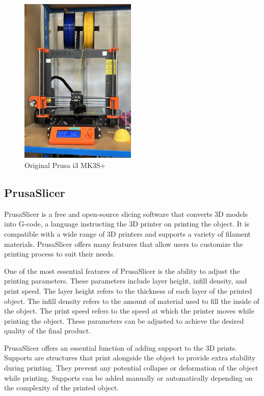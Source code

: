 \begin{figure}
  \centering
  \includegraphics[height=8cm]{texs/Part1/chapter1/image/prusa.jpg}
  \caption{Original Prusa i3 MK3S+}
  \label{fig:prusa_slicer_mk3}
\end{figure}

\subsection{PrusaSlicer}
\label{subsec:prusa_slicer}

PrusaSlicer is a free and open-source slicing software that converts 3D models into G-code, a language instructing the 3D printer on printing the object. It is compatible with a wide range of 3D printers and supports a variety of filament materials. PrusaSlicer offers many features that allow users to customize the printing process to suit their needs.

One of the most essential features of PrusaSlicer is the ability to adjust the printing parameters. These parameters include layer height, infill density, and print speed. The layer height refers to the thickness of each layer of the printed object. The infill density refers to the amount of material used to fill the inside of the object. The print speed refers to the speed at which the printer moves while printing the object. These parameters can be adjusted to achieve the desired quality of the final product.

PrusaSlicer offers an essential function of adding support to the 3D prints. Supports are structures that print alongside the object to provide extra stability during printing. They prevent any potential collapse or deformation of the object while printing. Supports can be added manually or automatically depending on the complexity of the printed object.

